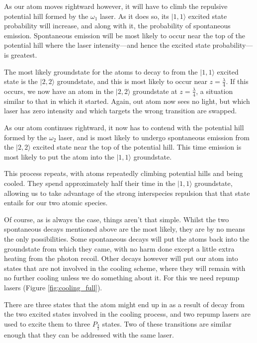 As our atom moves rightward however, it will have to climb the repulsive potential hill formed by the $\omega_1$ laser. As it does so, its $|1,1\rangle$ excited state probability will increase, and along with it, the probability of spontaneous emission. Spontaneous emission will be most likely to occur near the top of the potential hill where the laser intensity---and hence the excited state probability---is greatest.

The most likely groundstate for the atoms to decay to from the $|1,1\rangle$ excited state is the $|2,2\rangle$ groundstate, and this is most likely to occur near $z=\frac\lambda4$. If this occurs, we now have an atom in the $|2,2\rangle$ groundstate at $z=\frac\lambda4$, a situation similar to that in which it started. Again, out atom now sees no light, but which laser has zero intensity and which targets the wrong transition are swapped.

As our atom continues rightward, it now has to contend with the potential hill formed by the $\omega_2$ laser, and is most likely to undergo spontaneous emission from the $|2,2\rangle$ excited state near the top of the potential hill. This time emission is most likely to put the atom into the $|1,1\rangle$ groundstate.

This process repeats, with atoms repeatedly climbing potential hills and being cooled. They spend approximately half their time in the $|1,1\rangle$ groundstate, allowing us to take advantage of the strong interspecies repulsion that that state entails for our two atomic species.

Of course, as is always the case, things aren't that simple. Whilst the two spontaneous decays mentioned above are the most likely, they are by no means the only possibilities. Some spontaneous decays will put the atoms back into the groundstate from which they came, with no harm done except a little extra heating from the photon recoil. Other decays however will put our atom into states that are not involved in the cooling scheme, where they will remain with no further cooling unless we do something about it. For this we need repump lasers (Figure \ref{fig:cooling_full}).

There are three states that the atom might end up in as a result of decay from the two excited states involved in the cooling process, and two repump lasers are used to excite them to three $P_\frac32$ states. Two of these transitions are similar enough that they can be addressed with the same laser.

